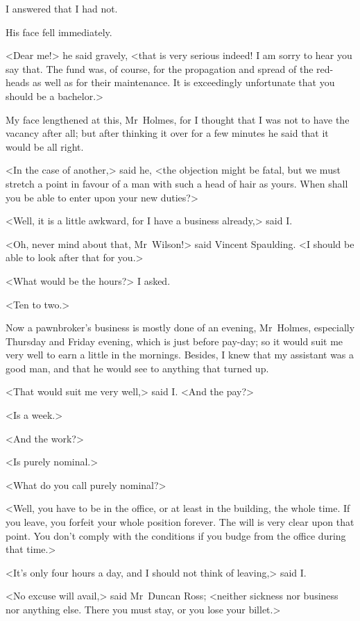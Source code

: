 I answered that I had not.

His face fell immediately.

<Dear me!> he said gravely, <that is very serious indeed! I am sorry to hear you say that. The fund was, of course, for the propagation and spread of the red-heads as well as for their maintenance. It is exceedingly unfortunate that you should be a bachelor.>

My face lengthened at this, Mr~Holmes, for I thought that I was not to have the vacancy after all; but after thinking it over for a few minutes he said that it would be all right.

<In the case of another,> said he, <the objection might be fatal, but we must stretch a point in favour of a man with such a head of hair as yours. When shall you be able to enter upon your new duties?>

<Well, it is a little awkward, for I have a business already,> said I\@.

<Oh, never mind about that, Mr~Wilson!> said Vincent Spaulding. <I should be able to look after that for you.>

<What would be the hours?> I asked.

<Ten to two.>

Now a pawnbroker's business is mostly done of an evening, Mr~Holmes, especially Thursday and Friday evening, which is just before pay-day; so it would suit me very well to earn a little in the mornings. Besides, I knew that my assistant was a good man, and that he would see to anything that turned up.

<That would suit me very well,> said I\@. <And the pay?>

<Is  a week.>

<And the work?>

<Is purely nominal.>

<What do you call purely nominal?>

<Well, you have to be in the office, or at least in the building, the whole time. If you leave, you forfeit your whole position forever. The will is very clear upon that point. You don't comply with the conditions if you budge from the office during that time.>

<It's only four hours a day, and I should not think of leaving,> said I\@.

<No excuse will avail,> said Mr~Duncan Ross; <neither sickness nor business nor anything else. There you must stay, or you lose your billet.>

